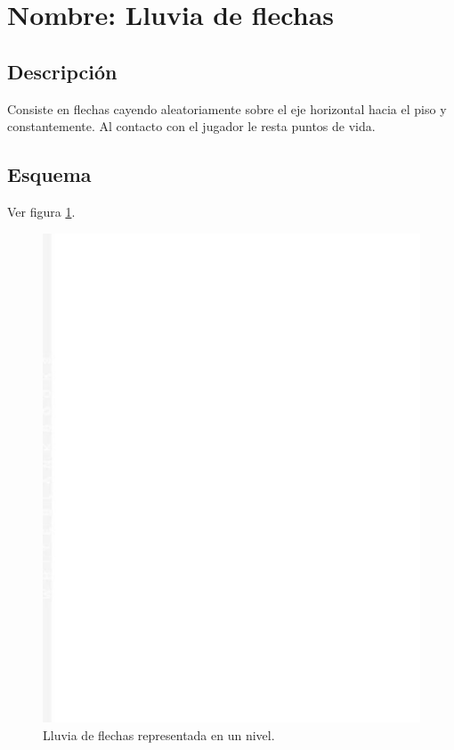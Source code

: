 		\section{Nombre: Lluvia de flechas}\label{obs.lluviaF}
	\subsection{Descripción}
	Consiste en flechas cayendo aleatoriamente sobre el eje horizontal hacia el piso y constantemente. Al contacto con el jugador le resta puntos de vida.
	\subsection{Esquema}
	Ver figura \ref{fig:lluviaF}.
	\begin{figure}
		\centering
		\includegraphics[height=0.2 \textheight]{Imagenes/lluviaF}
		\caption{Lluvia de flechas representada en un nivel.}
		\label{fig:lluviaF}
	\end{figure}